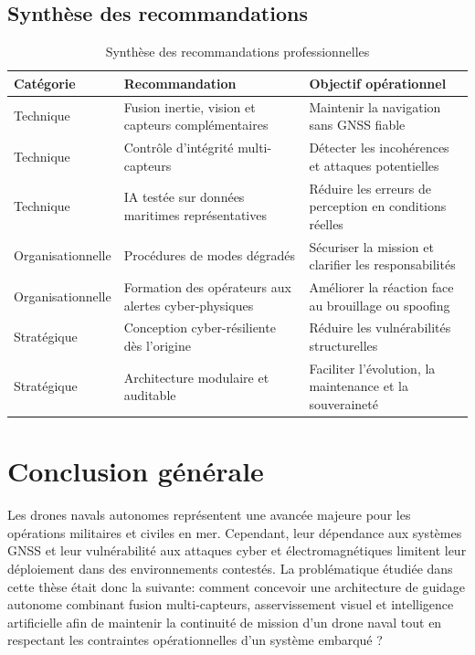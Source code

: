 \documentclass[12pt, a4paper, twoside, openright]{report}
\begin{document}
\section{Synthèse des recommandations}
\begin{table}[H]
\centering
\caption{Synthèse des recommandations professionnelles}
\begin{tabularx}{\textwidth}{p{3.4cm}XX}
\toprule
\textbf{Catégorie} & \textbf{Recommandation} & \textbf{Objectif opérationnel} \\
\midrule
Technique & Fusion inertie, vision et capteurs complémentaires & Maintenir la navigation sans GNSS fiable \\
Technique & Contrôle d’intégrité multi-capteurs & Détecter les incohérences et attaques potentielles \\
Technique & IA testée sur données maritimes représentatives & Réduire les erreurs de perception en conditions réelles \\
Organisationnelle & Procédures de modes dégradés & Sécuriser la mission et clarifier les responsabilités \\
Organisationnelle & Formation des opérateurs aux alertes cyber-physiques & Améliorer la réaction face au brouillage ou spoofing \\
Stratégique & Conception cyber-résiliente dès l’origine & Réduire les vulnérabilités structurelles \\
Stratégique & Architecture modulaire et auditable & Faciliter l’évolution, la maintenance et la souveraineté \\
\bottomrule
\end{tabularx}
\end{table}

\cleardoublepage

\chapter{Conclusion générale}
Les drones navals autonomes représentent une avancée majeure pour les opérations militaires et civiles en mer. Cependant, leur dépendance aux systèmes GNSS et leur vulnérabilité aux attaques cyber et électromagnétiques limitent leur déploiement dans des environnements contestés. La problématique étudiée dans cette thèse était donc la suivante: comment concevoir une architecture de guidage autonome combinant fusion multi-capteurs, asservissement visuel et intelligence artificielle afin de maintenir la continuité de mission d’un drone naval tout en respectant les contraintes opérationnelles d’un système embarqué ?
\end{document}
